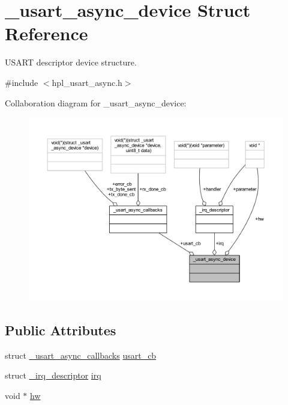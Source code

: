 \hypertarget{struct__usart__async__device}{}\section{\+\_\+usart\+\_\+async\+\_\+device Struct Reference}
\label{struct__usart__async__device}


U\+S\+A\+RT descriptor device structure.  




{\ttfamily \#include $<$hpl\+\_\+usart\+\_\+async.\+h$>$}



Collaboration diagram for \+\_\+usart\+\_\+async\+\_\+device\+:\nopagebreak
\begin{figure}[H]
\begin{center}
\leavevmode
\includegraphics[width=350pt]{struct__usart__async__device__coll__graph}
\end{center}
\end{figure}
\subsection*{Public Attributes}
\begin{DoxyCompactItemize}
\item 
struct \hyperlink{struct__usart__async__callbacks}{\+\_\+usart\+\_\+async\+\_\+callbacks} \hyperlink{struct__usart__async__device_af36f1abd8113ed4a2f06a9084519f369}{usart\+\_\+cb}
\item 
struct \hyperlink{struct__irq__descriptor}{\+\_\+irq\+\_\+descriptor} \hyperlink{struct__usart__async__device_a0eb2cf8aa3661fe0a22168429c04bf57}{irq}
\item 
void $\ast$ \hyperlink{struct__usart__async__device_a3eae9af22755ddfe25f8406c2939262f}{hw}
\end{DoxyCompactItemize}


